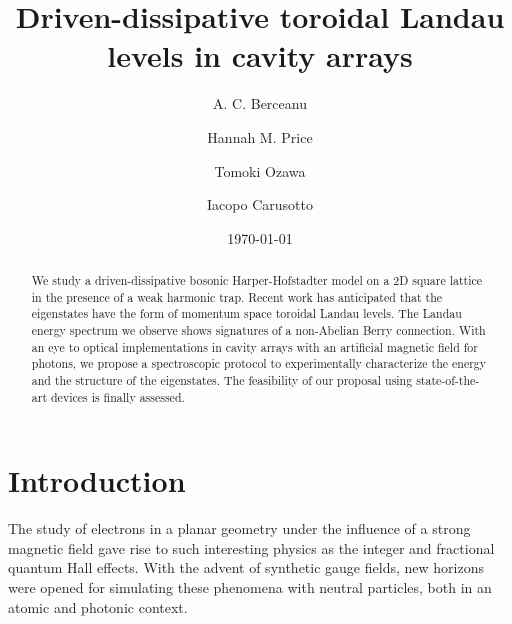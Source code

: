 \documentclass[twocolumn, 10pt, aps, superscriptaddress, floatfix, showpacs, pra, citeautoscript]{revtex4-1}
\newcommand{\co}[2]{#2}
\renewcommand{\paragraph}{\co}
\begin{document}
\title{Driven-dissipative toroidal Landau levels in cavity arrays}


\author{A. C. Berceanu}
\author{Hannah M. Price}
\author{Tomoki Ozawa}
\author{Iacopo Carusotto}

\date{\today}

\begin{abstract}
  We study a driven-dissipative bosonic Harper-Hofstadter model on a
  2D square lattice in the presence of a weak harmonic trap. Recent
  work has anticipated that the eigenstates have the form of momentum
  space toroidal Landau levels. The Landau energy spectrum we observe
  shows signatures of a non-Abelian Berry connection. With an eye to
  optical implementations in cavity arrays with an artificial magnetic
  field for photons, we propose a spectroscopic protocol to
  experimentally characterize the energy and the structure of the
  eigenstates. The feasibility of our proposal using state-of-the-art
  devices is finally assessed.
\end{abstract}

\maketitle


\section{Introduction}

\paragraph{Quantum magnetism is interesting, even more so in momentum space.}
The study of electrons in a planar geometry under the influence of a
strong magnetic field gave rise to such interesting physics as the
integer and fractional quantum Hall effects. With the advent of
synthetic gauge fields, new horizons were opened for simulating these
phenomena with neutral particles, both in an atomic and photonic
context.
\end{document}
